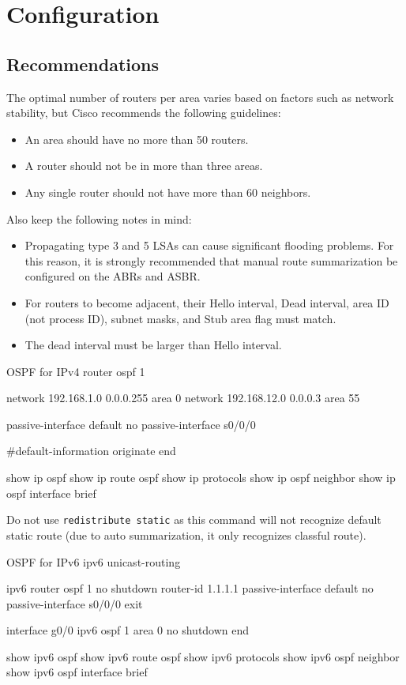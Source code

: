 \section{Configuration}

\subsection{Recommendations}

The optimal number of routers per area varies based on factors such as network stability, but Cisco recommends the following guidelines:
\begin{itemize}
\item An area should have no more than 50 routers.
\item A router should not be in more than three areas.
\item Any single router should not have more than 60 neighbors.
\end{itemize}

Also keep the following notes in mind:
\begin{itemize}
\item Propagating type 3 and 5 LSAs can cause significant flooding problems. For this reason, it is strongly recommended that manual route summarization be configured on the ABRs and ASBR.
\item For routers to become adjacent, their Hello interval, Dead interval, area ID (not process ID), subnet masks, and Stub area flag must match.
\item  The dead interval must be larger than Hello interval.
\end{itemize}

\begin{sexylisting}{OSPF for IPv4}
router ospf 1

network 192.168.1.0 0.0.0.255 area 0 
network 192.168.12.0 0.0.0.3 area 55

passive-interface default
no passive-interface s0/0/0

#default-information originate
end

show ip ospf
show ip route ospf
show ip protocols
show ip ospf neighbor
show ip ospf interface brief
\end{sexylisting}

\note Do not use \verb|redistribute static| as this command will not recognize default static route (due to auto summarization, it only recognizes classful route).

\begin{sexylisting}{OSPF for IPv6}
ipv6 unicast-routing

ipv6 router ospf 1
  no shutdown
  router-id 1.1.1.1
  passive-interface default
  no passive-interface s0/0/0
exit

interface g0/0 
  ipv6 ospf 1 area 0
  no shutdown
end

show ipv6 ospf
show ipv6 route ospf
show ipv6 protocols
show ipv6 ospf neighbor
show ipv6 ospf interface brief  
\end{sexylisting}

